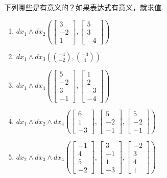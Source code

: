 \begin{question}\label{q:3-28}
下列哪些是有意义的？如果表达式有意义，就求值.
\begin{enumerate}
  \item[(a)] $dx_1\wedge dx_2\left(\begin{bmatrix}3\\-2\\1\end{bmatrix},\begin{bmatrix}5\\3\\-4\end{bmatrix}\right)$
  \item[(b)] $dx_1\wedge dx_3\left(\binom{-4}{-2},\binom{-3}{4}\right)$
  \item[(c)] $dx_1\wedge dx_4\left(\begin{bmatrix}5\\-2\\3\\-1\end{bmatrix},\begin{bmatrix}1\\2\\-3\\-4\end{bmatrix}\right)$
  \item[(d)] $dx_1\wedge dx_2\wedge dx_4\left(\begin{bmatrix}6\\1\\-3\end{bmatrix},\begin{bmatrix}5\\-2\\-1\end{bmatrix},\begin{bmatrix}5\\-2\\-1\end{bmatrix}\right)$
  \item[(e)] $dx_2\wedge dx_3\wedge dx_4\left(\begin{bmatrix}-1\\4\\5\\-2\end{bmatrix},\begin{bmatrix}3\\-1\\1\\-3\end{bmatrix},\begin{bmatrix}-2\\3\\4\\1\end{bmatrix}\right)$

\end{enumerate}
\end{question}
